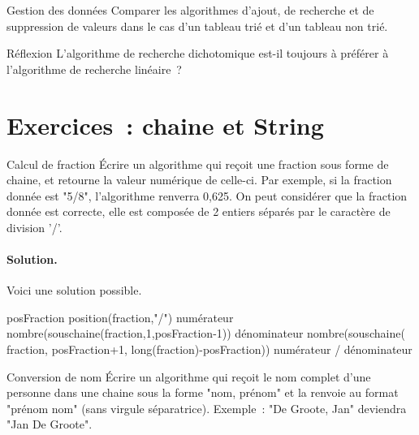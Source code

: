 	\begin{Exercice}{Gestion des données}
		Comparer les algorithmes d’ajout, 
		de recherche et de suppression
		de valeurs dans le cas d’un tableau trié
		et d’un tableau non trié.
	\end{Exercice}

	\begin{Exercice}{Réflexion}
		L’algorithme de recherche dichotomique 
		est-il toujours à préférer à
		l’algorithme de recherche linéaire~?
	\end{Exercice}



	



	
	
	
	
\section{Exercices~: chaine et String}

	\begin{Exercice}{Calcul de fraction}
		Écrire un algorithme 
		qui reçoit une fraction sous forme de chaine, 
		et retourne la valeur numérique de celle-ci. 
		Par exemple, si la fraction donnée est "5/8", 
		l’algorithme renverra 0,625. 
		On peut considérer que la fraction donnée est correcte, 
		elle est composée de 2 entiers séparés 
		par le caractère de division '/'.

		\paragraph{Solution.}
		Voici une solution possible.
		\begin{pseudocode}
			\Let posFraction \Gets position(fraction,"/")
			\Let numérateur \Gets nombre(souschaine(fraction,1,posFraction-1))
			\Let dénominateur \Gets nombre(souschaine(
				\Let\Indent fraction,
				\Let\Indent posFraction+1,
				\Let\Indent long(fraction)-posFraction))
			\Return numérateur / dénominateur
		\EndAlgo
	\end{pseudocode}
\end{Exercice}

\begin{Exercice}{Conversion de nom}
	Écrire un algorithme 
	qui reçoit le nom complet d’une personne 
	dans une chaine sous la forme "nom, prénom" 
	et la renvoie au format "prénom nom" 
	(sans virgule séparatrice). 
	Exemple~: "De Groote, Jan" deviendra "Jan De Groote".	
\end{Exercice}

